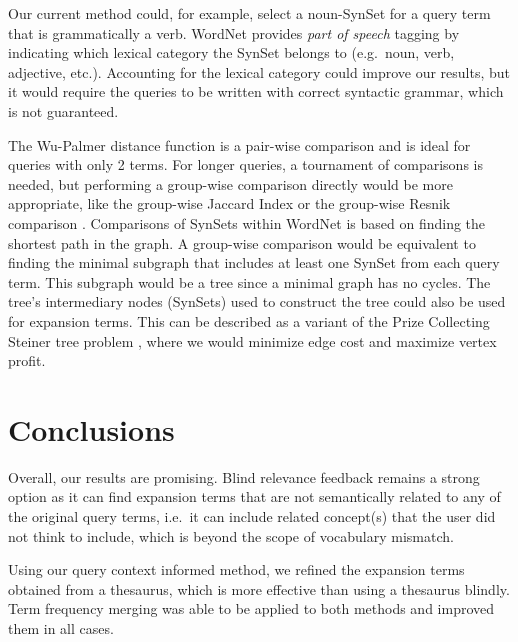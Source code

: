 Our current method could, for example, select a noun-SynSet for a query term that is grammatically a verb. WordNet provides \textit{part of speech} tagging by indicating which lexical category the SynSet belongs to (e.g.\ noun, verb, adjective, etc.). Accounting for the lexical category could improve our results, but it would require the queries to be written with correct syntactic grammar, which is not guaranteed.


The Wu-Palmer distance function is a pair-wise comparison and is ideal for queries with only 2 terms. For longer queries, a tournament of comparisons is needed, but performing a group-wise comparison directly would be more appropriate, like the group-wise Jaccard Index or the group-wise Resnik comparison \cite{Manda327833}. Comparisons of SynSets within WordNet is based on finding the shortest path in the graph. A group-wise comparison would be equivalent to finding the minimal subgraph that includes at least one SynSet from each query term. This subgraph would be a tree since a minimal graph has no cycles. The tree's intermediary nodes (SynSets) used to construct the tree could also be used for expansion terms. This can be described as a variant of the Prize Collecting Steiner tree problem \cite{Johnson:2000:PCS:338219.338637}, where we would minimize edge cost and maximize vertex profit. 


\section{Conclusions}
Overall, our results are promising. Blind relevance feedback remains a strong option as it can find expansion terms that are not semantically related to any of the original query terms, i.e.\ it can include related concept(s) that the user did not think to include, which is beyond the scope of vocabulary mismatch.

Using our query context informed method, we refined the expansion terms obtained from a thesaurus, which is more effective than using a thesaurus blindly. Term frequency merging was able to be applied to both methods and improved them in all cases. 





